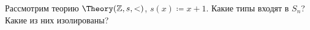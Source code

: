Рассмотрим теорию $\Theory(\mathbb{Z}, s, <)$, $s(x) \coloneqq x + 1$. Какие типы входят в $S_n$? Какие
из них изолированы?
